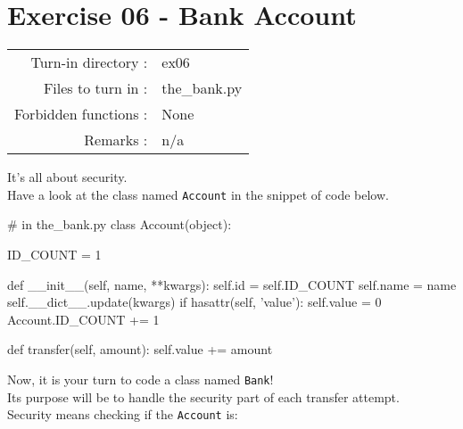 \documentclass[]{article}
\newenvironment{Shaded}{\begin{snugshade}}{\end{snugshade}}
\newcommand{\BuiltInTok}[1]{\textcolor[rgb]{0.50,0.55,0.55}{#1}}
\newcommand{\CommentTok}[1]{\textcolor[rgb]{0.48,0.49,0.49}{#1}}
\newcommand{\ControlFlowTok}[1]{\textcolor[rgb]{0.99,0.74,0.29}{#1}}
\newcommand{\DecValTok}[1]{\textcolor[rgb]{0.96,0.45,0.00}{#1}}
\newcommand{\FunctionTok}[1]{\textcolor[rgb]{0.56,0.27,0.68}{#1}}
\newcommand{\KeywordTok}[1]{\textcolor[rgb]{0.81,0.81,0.76}{#1}}
\newcommand{\NormalTok}[1]{\textcolor[rgb]{0.81,0.81,0.76}{#1}}
\newcommand{\OperatorTok}[1]{\textcolor[rgb]{0.81,0.81,0.76}{#1}}
\newcommand{\StringTok}[1]{\textcolor[rgb]{0.96,0.31,0.31}{#1}}
\newcommand{\VariableTok}[1]{\textcolor[rgb]{0.15,0.68,0.68}{#1}}
\begin{document}
\clearpage

\hypertarget{exercise-06---bank-account-1}{%
\section{Exercise 06 - Bank
Account}\label{exercise-06---bank-account-1}}

\begin{longtable}[]{@{}rl@{}}
\toprule
\endhead
Turn-in directory : & ex06\tabularnewline
Files to turn in : & the\_bank.py\tabularnewline
Forbidden functions : & None\tabularnewline
Remarks : & n/a\tabularnewline
\bottomrule
\end{longtable}

It's all about security.\\
Have a look at the class named \texttt{Account} in the snippet of code
below.

\begin{Shaded}
\begin{Highlighting}[]
\CommentTok{# in the_bank.py}
\KeywordTok{class}\NormalTok{ Account(}\BuiltInTok{object}\NormalTok{):}

\NormalTok{    ID_COUNT }\OperatorTok{=} \DecValTok{1}

    \KeywordTok{def} \FunctionTok{__init__}\NormalTok{(}\VariableTok{self}\NormalTok{, name, }\OperatorTok{**}\NormalTok{kwargs):}
        \VariableTok{self}\NormalTok{.}\BuiltInTok{id} \OperatorTok{=} \VariableTok{self}\NormalTok{.ID_COUNT}
        \VariableTok{self}\NormalTok{.name }\OperatorTok{=}\NormalTok{ name}
        \VariableTok{self}\NormalTok{.__dict__.update(kwargs)}
        \ControlFlowTok{if} \BuiltInTok{hasattr}\NormalTok{(}\VariableTok{self}\NormalTok{, }\StringTok{'value'}\NormalTok{):}
            \VariableTok{self}\NormalTok{.value }\OperatorTok{=} \DecValTok{0}
\NormalTok{        Account.ID_COUNT }\OperatorTok{+=} \DecValTok{1}
    
    \KeywordTok{def}\NormalTok{ transfer(}\VariableTok{self}\NormalTok{, amount):}
        \VariableTok{self}\NormalTok{.value }\OperatorTok{+=}\NormalTok{ amount}
\end{Highlighting}
\end{Shaded}

Now, it is your turn to code a class named \texttt{Bank}!\\
Its purpose will be to handle the security part of each transfer
attempt.\\
Security means checking if the \texttt{Account} is:
\end{document}
